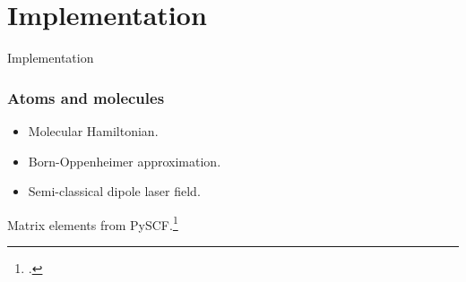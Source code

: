 \documentclass{beamer}
\begin{document}

\section{Implementation}

\begin{frame}[plain, c]
    \begin{center}
        \Huge Implementation
    \end{center}
\end{frame}

\begin{frame}
    \frametitle{Atoms and molecules}
    \begin{itemize}
        \item Molecular Hamiltonian.
        \item Born-Oppenheimer approximation.
        \item Semi-classical dipole laser field.
    \end{itemize}
    Matrix elements from PySCF.\footcite{pyscf}
\end{frame}
\end{document}
